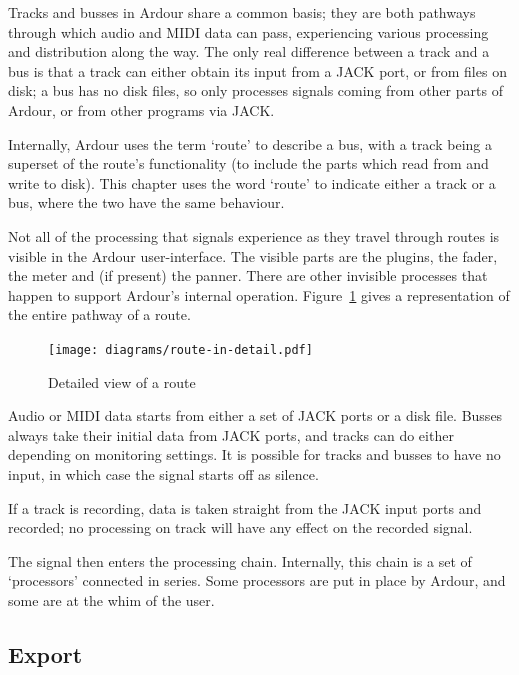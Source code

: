 \documentclass[10pt,a4paper]{book}
\begin{document}
Tracks and busses in Ardour share a common basis; they are both
pathways through which audio and MIDI data can pass, experiencing
various processing and distribution along the way.  The only real
difference between a track and a bus is that a track can either obtain
its input from a JACK port, or from files on disk; a bus has no disk
files, so only processes signals coming from other parts of Ardour, or
from other programs via JACK\@.

Internally, Ardour uses the term `route' to describe a bus, with a
track being a superset of the route's functionality (to include the
parts which read from and write to disk).  This chapter uses the word
`route' to indicate either a track or a bus, where the two have the
same behaviour.

Not all of the processing that signals experience as they travel
through routes is visible in the Ardour user-interface. The visible parts
are the plugins, the fader, the meter and (if present) the panner.
There are other invisible processes that happen to support Ardour's
internal operation.  Figure~\ref{fig:route-in-detail} gives a
representation of the entire pathway of a route.

\begin{figure}[ht]
\begin{center}
\texttt{[image: diagrams/route-in-detail.pdf]}
\end{center}
\caption{Detailed view of a route}
\label{fig:route-in-detail}
\end{figure}

Audio or MIDI data starts from either a set of JACK ports or a disk
file.  Busses always take their initial data from JACK ports, and
tracks can do either depending on monitoring settings.  It is possible
for tracks and busses to have no input, in which case the signal
starts off as silence.

If a track is recording, data is taken straight from the JACK input
ports and recorded; no processing on track will have any effect on the
recorded signal.

The signal then enters the processing chain.  Internally, this chain
is a set of `processors' connected in series.  Some processors are put
in place by Ardour, and some are at the whim of the user.

\subsection{Export}
\end{document}
